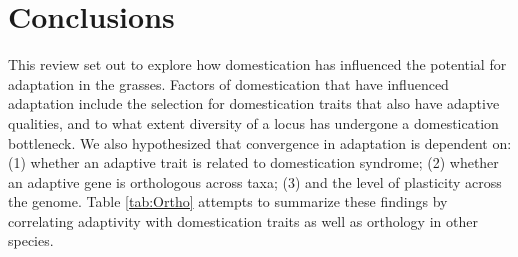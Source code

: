 \documentclass[12pt]{article}
\begin{document}
\section*{Conclusions}
This review set out to explore how domestication has influenced the potential for adaptation in the grasses.
Factors of domestication that have influenced adaptation include the selection for domestication traits that also have adaptive qualities, and to what extent diversity of a locus has undergone a domestication bottleneck.
We also hypothesized that  convergence in adaptation is dependent on:  (1) whether an adaptive trait is related to domestication syndrome; (2) whether an adaptive gene is orthologous across taxa; (3) and the level of plasticity across the genome.
 Table \ref{tab:Ortho} attempts to summarize these findings by correlating adaptivity with domestication traits as well as orthology in other species.   




\end{document}
